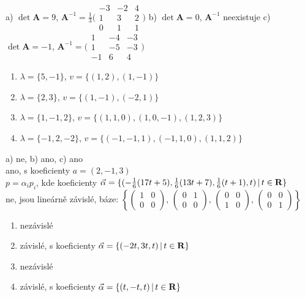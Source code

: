\documentclass[a4paper,10pt]{book}
\def\Real{{\rm\bf R}}
\def\where{\,|\,}                    %
\begin{document}
 a) $\det\mathbf{A}=9$, $\mathbf{A}^{-1}=\frac{1}{3}\bigl(\begin{smallmatrix} -3 & -2 & 4\\ 1 & 3 & 2 \\ 0 & 1 & 1 \end{smallmatrix} \bigr)$  
               b) $\det\mathbf{A}=0$, $\mathbf{A}^{-1}$ neexistuje
               c) $\det\mathbf{A}=-1$, $\mathbf{A}^{-1}=\bigl(\begin{smallmatrix} 1 & -4 & -3\\ 1 & -5 & -3 \\ -1 & 6 & 4 \end{smallmatrix} \bigr)$  
    
  \begin{enumerate}[leftmargin=.75cm,align=left,itemsep=-5pt, topsep=-7pt]
    \item $\lambda=\{5,-1\}$, $v=\{(1,2),(1,-1)\}$  
    \item $\lambda=\{2,3\}$, $v=\{(1,-1),(-2,1)\}$  
    \item $\lambda=\{1,-1,2\}$, $v=\{(1,1,0),(1,0,-1),(1,2,3)\}$    
    \item $\lambda=\{-1,2,-2\}$, $v=\{(-1,-1,1),(-1,1,0),(1,1,2)\}$
  \end{enumerate}

 a) ne, b) ano, c) ano \\
 ano, s koeficienty $a=(2,-1,3)$ \\
 $p = \alpha_i p_i$, kde koeficienty $\vec\alpha=\{(-\frac{1}{6}(17t+5),
              \frac{1}{6}(13t+7),\frac{1}{6}(t+1),t)\where t\in\Real\}$ \\
 ne, jsou lineárně závislé, báze: 
$ \left\{\left(\begin{smallmatrix} 1 & 0 \\ 0 & 0
  \end{smallmatrix}\right),\,
  \left(\begin{smallmatrix}
        0 & 1 \\ 0 & 0
  \end{smallmatrix}\right),\,
  \left(\begin{smallmatrix}
        0 & 0 \\ 1 & 0
  \end{smallmatrix} \right),\,
  \left(\begin{smallmatrix}
        0 & 0 \\ 0 & 1
  \end{smallmatrix}\right)\right\}
$ \\
  \begin{enumerate}[label=\alph*), itemsep=-5pt, topsep=-7pt]
    \item nezávislé    
    \item závislé, s koeficienty $\vec\alpha=\{(-2t,3t,t)\where t\in\Real\}$
    \item nezávislé
    \item závislé, s koeficienty $\vec\alpha=\{(t,-t,t)\where t\in\Real\}$
  \end{enumerate}
\end{document}
